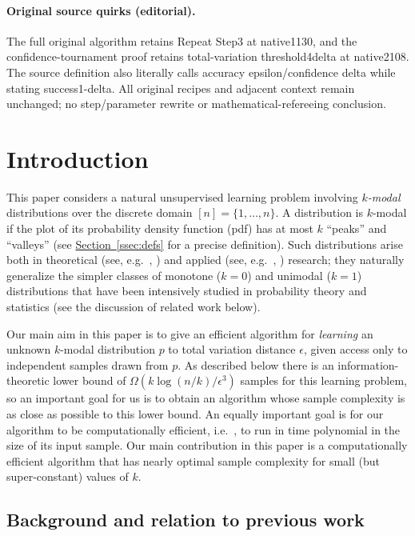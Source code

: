 \documentclass[10pt]{article}
\theoremstyle{definition}
\providecommand{\eg}{e.g.\ }
\providecommand{\ie}{i.e.\ }
\numberwithin{equation}{section}
\newcommand{\expref}[2]{\texorpdfstring{\hyperref[#2]{#1~\ref{#2}}}{#1~\ref{#2}}}
\newcommand{\eps}{\epsilon}
\begin{document}
\paragraph{Original source quirks (editorial).} The full original algorithm retains Repeat Step3 at native1130, and the confidence-tournament proof retains total-variation threshold4delta at native2108. The source definition also literally calls accuracy epsilon/confidence delta while stating success1-delta. All original recipes and adjacent context remain unchanged; no step/parameter rewrite or mathematical-refereeing conclusion.
\clearpage

\section{Introduction} \label{sec:intro}

%

This paper considers a natural unsupervised learning problem involving \emph{$k$-modal} distributions
  over the discrete domain $ {[n]=}\{1,\dots,n\}$. A distribution is
$k$-modal if the plot of its probability density function (pdf) has at most $k$ ``peaks''
and ``valleys'' (see \expref{Section}{ssec:defs} for a precise definition).  Such distributions arise both in theoretical (see, \eg, \cite{CKC:83,Kemperman:91,ChanTong:04}) and applied (see, \eg, \cite{Murphy:64,ToledoFernandez:90,FPPRD:98}) research; they naturally generalize the simpler classes of monotone ($k=0$) and unimodal ($k=1$) distributions
that have been intensively studied in probability theory and statistics (see the discussion of related work below).

Our main aim in this paper is to give an efficient algorithm for \emph{learning}
an unknown $k$-modal distribution $p$ to total variation distance $\eps$, given access only to independent samples drawn from $p$.  As described below there is an information-theoretic lower bound of
$\Omega(k \log(n/k)/\eps^3)$ samples for this learning problem, so an important goal for us is to
 obtain an algorithm whose sample complexity is as close as possible to this lower bound.  An equally important goal is for our
algorithm to be computationally efficient, \ie, to run in time 
polynomial in the size of its input sample.  
Our main contribution in this paper is a computationally efficient
algorithm that has nearly optimal sample complexity for 
small (but super-constant) values of $k$.


\subsection{Background and  relation to previous work} \label{sec:background}
\end{document}

